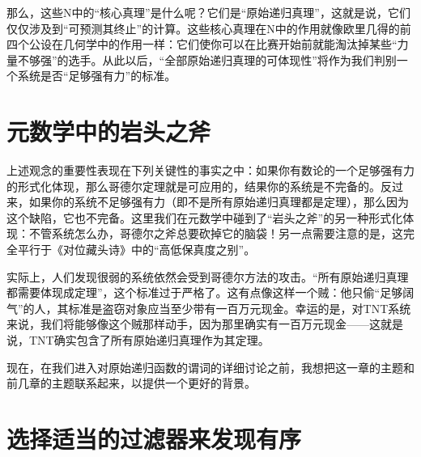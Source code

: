 那么，这些N中的“核心真理”是什么呢？它们是“原始递归真理”，这就是说，它们仅仅涉及到“可预测其终止”的计算。这些核心真理在N中的作用就像欧里几得的前四个公设在几何学中的作用一样：它们使你可以在比赛开始前就能淘汰掉某些“力量不够强”的选手。从此以后，“全部原始递归真理的可体现性”将作为我们判别一个系统是否“足够强有力”的标准。

\section{元数学中的岩头之斧}

上述观念的重要性表现在下列关键性的事实之中：如果你有数论的一个足够强有力的形式化体现，那么哥德尔定理就是可应用的，结果你的系统是不完备的。反过来，如果你的系统不足够强有力（即不是所有原始递归真理都是定理），那么因为这个缺陷，它也不完备。这里我们在元数学中碰到了“岩头之斧”的另一种形式化体现：不管系统怎么办，哥德尔之斧总要砍掉它的脑袋！另一点需要注意的是，这完全平行于《对位藏头诗》中的“高低保真度之别”。

实际上，人们发现很弱的系统依然会受到哥德尔方法的攻击。“所有原始递归真理都需要体现成定理”，这个标准过于严格了。这有点像这样一个贼：他只偷“足够阔气”的人，其标准是盗窃对象应当至少带有一百万元现金。幸运的是，对TNT系统来说，我们将能够像这个贼那样动手，因为那里确实有一百万元现金——这就是说，TNT确实包含了所有原始递归真理作为其定理。

现在，在我们进入对原始递归函数的谓词的详细讨论之前，我想把这一章的主题和前几章的主题联系起来，以提供一个更好的背景。

\section{选择适当的过滤器来发现有序}

